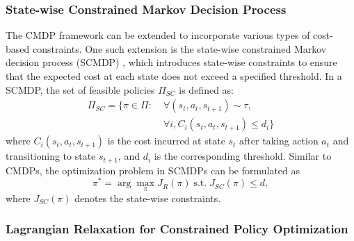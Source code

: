 \subsubsection{State-wise Constrained Markov Decision Process}

The CMDP framework can be extended to incorporate various types of cost-based constraints.
One such extension is the state-wise constrained Markov decision process (SCMDP) \cite{zhao2023state}, which introduces state-wise constraints to ensure that the expected cost at each state does not exceed a specified threshold.
In a SCMDP, the set of feasible policies $\Pi_{SC}$ is defined as:
\begin{equation}
    \begin{aligned}    
        \Pi_{SC} = \{ \pi \in \Pi: &\; \forall (s_t, a_t, s_{t + 1}) \sim \tau, \\
                                &\; \forall i, C_i(s_t, a_t, s_{t + 1}) \leq d_i \}
    \end{aligned}
\end{equation}
where $C_i(s_t, a_t, s_{t + 1})$ is the cost incurred at state $s_t$ after taking action $a_t$ and transitioning to state $s_{t + 1}$, and $d_i$ is the corresponding threshold.
Similar to CMDPs, the optimization problem in SCMDPs can be formulated as
\begin{equation}
    \pi^* = \arg\max_\pi J_R(\pi) \; \text{s.t.} \; J_{SC}(\pi) \leq d ,
\end{equation}
where $J_{SC}(\pi)$ denotes the state-wise constraints.  %

\subsubsection{Lagrangian Relaxation for Constrained Policy Optimization}


